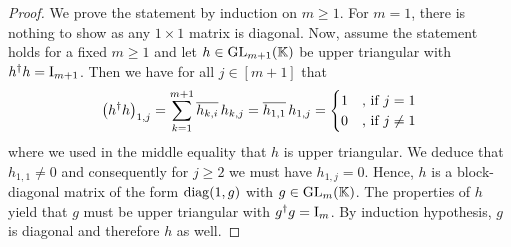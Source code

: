 \begin{proof}
	We prove the statement by induction on $m \geq 1$. For $m=1$, there is nothing to show as any $1 \times 1$ matrix is diagonal. Now, assume the statement holds for a fixed $m \geq 1$ and let $h \in \operatorname{GL}_{m+1}(\mathbb K)$ be upper triangular with $h^{\dagger} h = \operatorname{I}_{m+1}$. Then we have for all $j \in [m+1]$ that
		\[ \big( h^{\dagger} h \big)_{1,j} = \sum_{k =1}^{m+1} \overline{h_{k,i}} \, h_{k,j} =  \overline{h_{1,1}} \, h_{1,j}
		= \begin{cases} 1 & \text{, if } j=1  \\ 0 & \text{, if } j \neq 1  \end{cases}\]
	where we used in the middle equality that $h$ is upper triangular. We deduce that $h_{1,1} \neq 0$ and consequently for $j \geq 2$ we must have $h_{1,j} = 0$. Hence, $h$ is a block-diagonal matrix of the form $\operatorname{diag}(1,g)$ with $g \in \operatorname{GL}_m(\mathbb K)$. The properties of $h$ yield that $g$ must be upper triangular with $g^{\dagger} g = \operatorname{I}_{m}$. By induction hypothesis, $g$ is diagonal and therefore $h$ as well.
\end{proof}




















